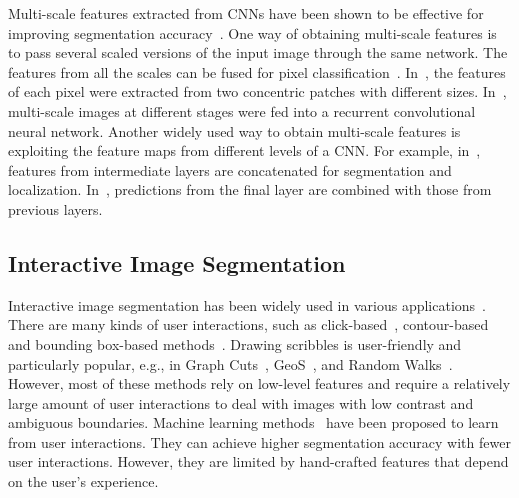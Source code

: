 \documentclass[10pt,journal,compsoc]{IEEEtran}
\begin{document}
Multi-scale features extracted from CNNs have been shown to be effective for improving segmentation accuracy~\cite{Long2014, Chen2015iclr,Onvolutions2016}. One way of obtaining multi-scale features is to pass several scaled versions of the input image through the same network. The features from all the scales can be fused for pixel classification~\cite{Lin2016cvpr_efficient}. %
 In~\cite{Havaei2016, Kamnitsas2017}, the features of each pixel were extracted from two concentric patches with different sizes. In~\cite{Pinheiro2014}, multi-scale images at different stages were fed into a recurrent convolutional neural network. Another widely used way to obtain multi-scale features is exploiting the feature maps from different levels of a CNN. For example, in~\cite{Hariharan2015}, features from intermediate layers are concatenated for segmentation and localization. In~\cite{Long2014, Chen2015iclr}, predictions from the final layer are combined with those from previous layers. %

\subsection{Interactive Image Segmentation}
Interactive image segmentation has been widely used in various applications~\cite{Armstrong2007,Cates2004,Rajchl2016}. There are many kinds of user interactions, such as click-based~\cite{Haider2015}, contour-based~\cite{Xu1998} and bounding box-based methods~\cite{Rother2004}. Drawing scribbles is user-friendly and particularly popular, e.g., in Graph Cuts~\cite{Boykov2001}, GeoS~\cite{Bai2007, Criminisi2008}, and Random Walks~\cite{Grady2006a}. %
However, most of these methods rely on low-level features and require a relatively large amount of user interactions to deal with images with low contrast and ambiguous boundaries. Machine learning methods~\cite{Barinova2012, Wang2016,Luengo2017} have been proposed to learn from user interactions. They can achieve higher segmentation accuracy with fewer user interactions. However, they are limited by hand-crafted features that depend on the user's experience.
\end{document}
